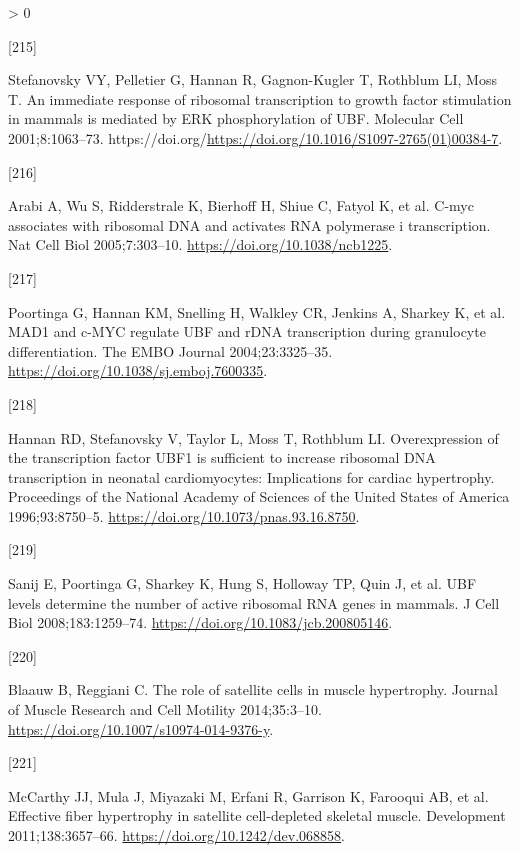 \documentclass[twoside,10pt]{gihclass} %
\newlength{\cslhangindent}
\newlength{\csllabelwidth}
\newenvironment{CSLReferences}[3] %
 {%
  \setlength{\parindent}{0pt}
  \ifodd #1 \everypar{\setlength{\hangindent}{\cslhangindent}}\ignorespaces\fi
  \ifnum #2 > 0
  \setlength{\parskip}{#2\baselineskip}
  \fi
 }%
 {}
\newcommand{\CSLLeftMargin}[1]{\parbox[t]{\maxof{\widthof{#1}}{\csllabelwidth}}{#1}}
\newcommand{\CSLRightInline}[1]{\parbox[t]{\linewidth}{#1}}
\begin{document}
\begin{CSLReferences}{0}{0}
\leavevmode\hypertarget{ref-RN2604}{}%
\CSLLeftMargin{{[}215{]} }
\CSLRightInline{Stefanovsky VY, Pelletier G, Hannan R, Gagnon-Kugler T, Rothblum LI, Moss T. An immediate response of ribosomal transcription to growth factor stimulation in mammals is mediated by ERK phosphorylation of UBF. Molecular Cell 2001;8:1063--73. https://doi.org/\url{https://doi.org/10.1016/S1097-2765(01)00384-7}.}

\leavevmode\hypertarget{ref-RN1834}{}%
\CSLLeftMargin{{[}216{]} }
\CSLRightInline{Arabi A, Wu S, Ridderstrale K, Bierhoff H, Shiue C, Fatyol K, et al. C-myc associates with ribosomal DNA and activates RNA polymerase i transcription. Nat Cell Biol 2005;7:303--10. \url{https://doi.org/10.1038/ncb1225}.}

\leavevmode\hypertarget{ref-RN2565}{}%
\CSLLeftMargin{{[}217{]} }
\CSLRightInline{Poortinga G, Hannan KM, Snelling H, Walkley CR, Jenkins A, Sharkey K, et al. MAD1 and c-MYC regulate UBF and rDNA transcription during granulocyte differentiation. The EMBO Journal 2004;23:3325--35. \url{https://doi.org/10.1038/sj.emboj.7600335}.}

\leavevmode\hypertarget{ref-RN2566}{}%
\CSLLeftMargin{{[}218{]} }
\CSLRightInline{Hannan RD, Stefanovsky V, Taylor L, Moss T, Rothblum LI. Overexpression of the transcription factor UBF1 is sufficient to increase ribosomal DNA transcription in neonatal cardiomyocytes: Implications for cardiac hypertrophy. Proceedings of the National Academy of Sciences of the United States of America 1996;93:8750--5. \url{https://doi.org/10.1073/pnas.93.16.8750}.}

\leavevmode\hypertarget{ref-RN2556}{}%
\CSLLeftMargin{{[}219{]} }
\CSLRightInline{Sanij E, Poortinga G, Sharkey K, Hung S, Holloway TP, Quin J, et al. UBF levels determine the number of active ribosomal RNA genes in mammals. J Cell Biol 2008;183:1259--74. \url{https://doi.org/10.1083/jcb.200805146}.}

\leavevmode\hypertarget{ref-RN2080}{}%
\CSLLeftMargin{{[}220{]} }
\CSLRightInline{Blaauw B, Reggiani C. The role of satellite cells in muscle hypertrophy. Journal of Muscle Research and Cell Motility 2014;35:3--10. \url{https://doi.org/10.1007/s10974-014-9376-y}.}

\leavevmode\hypertarget{ref-RN2864}{}%
\CSLLeftMargin{{[}221{]} }
\CSLRightInline{McCarthy JJ, Mula J, Miyazaki M, Erfani R, Garrison K, Farooqui AB, et al. Effective fiber hypertrophy in satellite cell-depleted skeletal muscle. Development 2011;138:3657--66. \url{https://doi.org/10.1242/dev.068858}.}


\end{CSLReferences}
\end{document}
